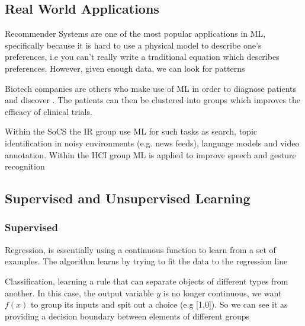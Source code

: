 \subsection{Real World Applications}

	\par{Recommender Systems are one of the most popular applications in ML, specifically because it is hard to use a physical model to describe one's preferences, i.e you can't really write a traditional equation which describes preferences. However, given enough data, we can look for patterns}

	\par{Biotech companies are others who make use of ML in order to diagnose patients and discover . The patients can then be clustered into groups which improves the efficacy of clinical trials.}


	\par{Within the SoCS the IR group use ML for such tasks as search, topic identification in noisy environments (e.g. news feeds), language models and video annotation. Within the HCI group ML is applied to improve speech and gesture recognition}


\subsection{Supervised and Unsupervised Learning}

	\subsubsection{Supervised}


		\par{Regression, is essentially using a continuous function to learn from a set of examples. The algorithm learns by trying to fit the data to the regression line}



		\par{Classification, learning a rule that can separate objects of different types from another. In this case, the output variable $y$ is no longer continuous, we want $f(x)$ to group its inputs and spit out a  choice (e.g [1,0]). So we can see it as providing a decision boundary between elements of different groups}

